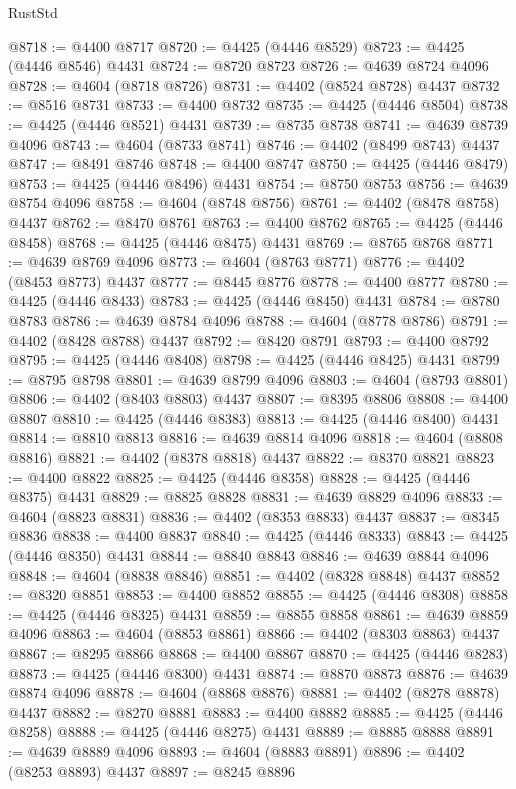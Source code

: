 \begin{lexlean}{RustStd}
\begin{coremodule}
@8718 := @4400 @8717
@8720 := @4425 (@4446 @8529)
@8723 := @4425 (@4446 @8546) @4431
@8724 := @8720 @8723
@8726 := @4639 @8724 @4096
@8728 := @4604 (@8718 @8726)
@8731 := @4402 (@8524 @8728) @4437
@8732 := @8516 @8731
@8733 := @4400 @8732
@8735 := @4425 (@4446 @8504)
@8738 := @4425 (@4446 @8521) @4431
@8739 := @8735 @8738
@8741 := @4639 @8739 @4096
@8743 := @4604 (@8733 @8741)
@8746 := @4402 (@8499 @8743) @4437
@8747 := @8491 @8746
@8748 := @4400 @8747
@8750 := @4425 (@4446 @8479)
@8753 := @4425 (@4446 @8496) @4431
@8754 := @8750 @8753
@8756 := @4639 @8754 @4096
@8758 := @4604 (@8748 @8756)
@8761 := @4402 (@8478 @8758) @4437
@8762 := @8470 @8761
@8763 := @4400 @8762
@8765 := @4425 (@4446 @8458)
@8768 := @4425 (@4446 @8475) @4431
@8769 := @8765 @8768
@8771 := @4639 @8769 @4096
@8773 := @4604 (@8763 @8771)
@8776 := @4402 (@8453 @8773) @4437
@8777 := @8445 @8776
@8778 := @4400 @8777
@8780 := @4425 (@4446 @8433)
@8783 := @4425 (@4446 @8450) @4431
@8784 := @8780 @8783
@8786 := @4639 @8784 @4096
@8788 := @4604 (@8778 @8786)
@8791 := @4402 (@8428 @8788) @4437
@8792 := @8420 @8791
@8793 := @4400 @8792
@8795 := @4425 (@4446 @8408)
@8798 := @4425 (@4446 @8425) @4431
@8799 := @8795 @8798
@8801 := @4639 @8799 @4096
@8803 := @4604 (@8793 @8801)
@8806 := @4402 (@8403 @8803) @4437
@8807 := @8395 @8806
@8808 := @4400 @8807
@8810 := @4425 (@4446 @8383)
@8813 := @4425 (@4446 @8400) @4431
@8814 := @8810 @8813
@8816 := @4639 @8814 @4096
@8818 := @4604 (@8808 @8816)
@8821 := @4402 (@8378 @8818) @4437
@8822 := @8370 @8821
@8823 := @4400 @8822
@8825 := @4425 (@4446 @8358)
@8828 := @4425 (@4446 @8375) @4431
@8829 := @8825 @8828
@8831 := @4639 @8829 @4096
@8833 := @4604 (@8823 @8831)
@8836 := @4402 (@8353 @8833) @4437
@8837 := @8345 @8836
@8838 := @4400 @8837
@8840 := @4425 (@4446 @8333)
@8843 := @4425 (@4446 @8350) @4431
@8844 := @8840 @8843
@8846 := @4639 @8844 @4096
@8848 := @4604 (@8838 @8846)
@8851 := @4402 (@8328 @8848) @4437
@8852 := @8320 @8851
@8853 := @4400 @8852
@8855 := @4425 (@4446 @8308)
@8858 := @4425 (@4446 @8325) @4431
@8859 := @8855 @8858
@8861 := @4639 @8859 @4096
@8863 := @4604 (@8853 @8861)
@8866 := @4402 (@8303 @8863) @4437
@8867 := @8295 @8866
@8868 := @4400 @8867
@8870 := @4425 (@4446 @8283)
@8873 := @4425 (@4446 @8300) @4431
@8874 := @8870 @8873
@8876 := @4639 @8874 @4096
@8878 := @4604 (@8868 @8876)
@8881 := @4402 (@8278 @8878) @4437
@8882 := @8270 @8881
@8883 := @4400 @8882
@8885 := @4425 (@4446 @8258)
@8888 := @4425 (@4446 @8275) @4431
@8889 := @8885 @8888
@8891 := @4639 @8889 @4096
@8893 := @4604 (@8883 @8891)
@8896 := @4402 (@8253 @8893) @4437
@8897 := @8245 @8896

\end{coremodule}
\end{lexlean}
